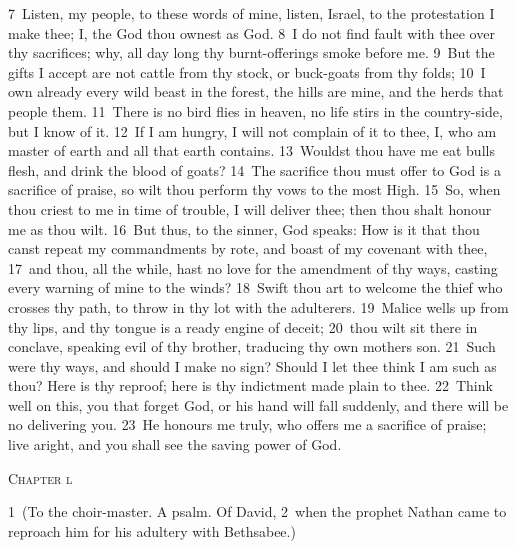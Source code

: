 \documentclass[10pt]{book} %
\begin{document}
\textcolor{benred8}{7}~Listen, my people, to these words of mine, listen, Israel, to the protestation I make thee; I, the God thou ownest as God. \textcolor{benred8}{8}~I do not find fault with thee over thy sacrifices; why, all day long thy burnt-offerings smoke before me. \textcolor{benred8}{9}~But the gifts I accept are not cattle from thy stock, or buck-goats from thy folds; \textcolor{benred8}{10}~I own already every wild beast in the forest, the hills are mine, and the herds that people them. \textcolor{benred8}{11}~There is no bird flies in heaven, no life stirs in the country-side, but I know of it. \textcolor{benred8}{12}~If I am hungry, I will not complain of it to thee, I, who am master of earth and all that earth contains. \textcolor{benred8}{13}~Wouldst thou have me eat bull\textquotesingle s flesh, and drink the blood of goats? \textcolor{benred8}{14}~The sacrifice thou must offer to God is a sacrifice of praise, so wilt thou perform thy vows to the most High. \textcolor{benred8}{15}~So, when thou criest to me in time of trouble, I will deliver thee; then thou shalt honour me as thou wilt.
\textcolor{benred8}{16}~But thus, to the sinner, God speaks: How is it that thou canst repeat my commandments by rote, and boast of my covenant with thee, \textcolor{benred8}{17}~and thou, all the while, hast no love for the amendment of thy ways, casting every warning of mine to the winds? \textcolor{benred8}{18}~Swift thou art to welcome the thief who crosses thy path, to throw in thy lot with the adulterers. \textcolor{benred8}{19}~Malice wells up from thy lips, and thy tongue is a ready engine of deceit; \textcolor{benred8}{20}~thou wilt sit there in conclave, speaking evil of thy brother, traducing thy own mother\textquotesingle s son. \textcolor{benred8}{21}~Such were thy ways, and should I make no sign? Should I let thee think I am such as thou? Here is thy reproof; here is thy indictment made plain to thee. \textcolor{benred8}{22}~Think well on this, you that forget God, or his hand will fall suddenly, and there will be no delivering you. \textcolor{benred8}{23}~He honours me truly, who offers me a sacrifice of praise; live aright, and you shall see the saving power of God.
\begin{large}\begin{center}\textsc{Chapter l}\end{center}\end{large}
\textcolor{benred8}{1}~(To the choir-master. A psalm. Of David, \textcolor{benred8}{2}~when the prophet Nathan came to reproach him for his adultery with Bethsabee.)
\end{document}
